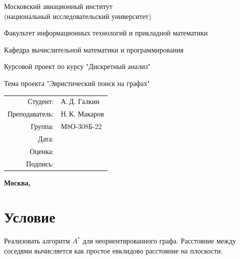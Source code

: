 \documentclass[12pt,a4paper]{article}
\begin{document}
\begin{titlepage}
\begin{center}
\bfseries

{\Large Московский авиационный институт\\ (национальный исследовательский университет)}

\vspace{48pt}

{\large Факультет информационных технологий и прикладной математики}

\vspace{36pt}

{\large Кафедра вычислительной математики и программирования}

\vspace{48pt}

Курсовой проект по курсу "Дискретный анализ"

Тема проекта "Эвристический поиск на графах"
\end{center}

\vspace{72pt}

\begin{flushright}
\begin{tabular}{rl}
Студент: & А.\,Д. Галкин \\
Преподаватель: & Н.\,К. Макаров \\
Группа: & М8О-308Б-22 \\
Дата: & \underline{\hspace{3cm}} \\
Оценка: & \underline{\hspace{3cm}} \\
Подпись: & \underline{\hspace{3cm}} \\
\end{tabular}
\end{flushright}

\vfill

\begin{center}
\bfseries
Москва, \the\year
\end{center}
\end{titlepage}

\newpage

\section*{Условие}

Реализовать алгоритм $A^*$ для неориентированного графа. Расстояние между соседями вычисляется как простое евклидово расстояние на плоскости.
\end{document}
